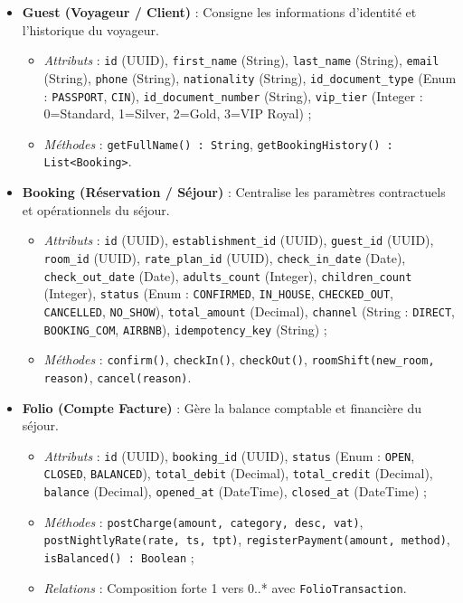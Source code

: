 \begin{itemize}
    \item \textbf{Guest (Voyageur / Client)} : Consigne les informations d'identité et l'historique du voyageur.
    \begin{itemize}
        \item \textit{Attributs} : \texttt{id} (UUID), \texttt{first\_name} (String), \texttt{last\_name} (String), \texttt{email} (String), \texttt{phone} (String), \texttt{nationality} (String), \texttt{id\_document\_type} (Enum : \texttt{PASSPORT}, \texttt{CIN}), \texttt{id\_document\_number} (String), \texttt{vip\_tier} (Integer : 0=Standard, 1=Silver, 2=Gold, 3=VIP Royal) ;
        \item \textit{Méthodes} : \texttt{getFullName() : String}, \texttt{getBookingHistory() : List<Booking>}.
    \end{itemize}

    \item \textbf{Booking (Réservation / Séjour)} : Centralise les paramètres contractuels et opérationnels du séjour.
    \begin{itemize}
        \item \textit{Attributs} : \texttt{id} (UUID), \texttt{establishment\_id} (UUID), \texttt{guest\_id} (UUID), \texttt{room\_id} (UUID), \texttt{rate\_plan\_id} (UUID), \texttt{check\_in\_date} (Date), \texttt{check\_out\_date} (Date), \texttt{adults\_count} (Integer), \texttt{children\_count} (Integer), \texttt{status} (Enum : \texttt{CONFIRMED}, \texttt{IN\_HOUSE}, \texttt{CHECKED\_OUT}, \texttt{CANCELLED}, \texttt{NO\_SHOW}), \texttt{total\_amount} (Decimal), \texttt{channel} (String : \texttt{DIRECT}, \texttt{BOOKING\_COM}, \texttt{AIRBNB}), \texttt{idempotency\_key} (String) ;
        \item \textit{Méthodes} : \texttt{confirm()}, \texttt{checkIn()}, \texttt{checkOut()}, \texttt{roomShift(new\_room, reason)}, \texttt{cancel(reason)}.
    \end{itemize}

    \item \textbf{Folio (Compte Facture)} : Gère la balance comptable et financière du séjour.
    \begin{itemize}
        \item \textit{Attributs} : \texttt{id} (UUID), \texttt{booking\_id} (UUID), \texttt{status} (Enum : \texttt{OPEN}, \texttt{CLOSED}, \texttt{BALANCED}), \texttt{total\_debit} (Decimal), \texttt{total\_credit} (Decimal), \texttt{balance} (Decimal), \texttt{opened\_at} (DateTime), \texttt{closed\_at} (DateTime) ;
        \item \textit{Méthodes} : \texttt{postCharge(amount, category, desc, vat)}, \texttt{postNightlyRate(rate, ts, tpt)}, \texttt{registerPayment(amount, method)}, \texttt{isBalanced() : Boolean} ;
        \item \textit{Relations} : Composition forte 1 vers 0..* avec \texttt{FolioTransaction}.
    \end{itemize}


\end{itemize}
